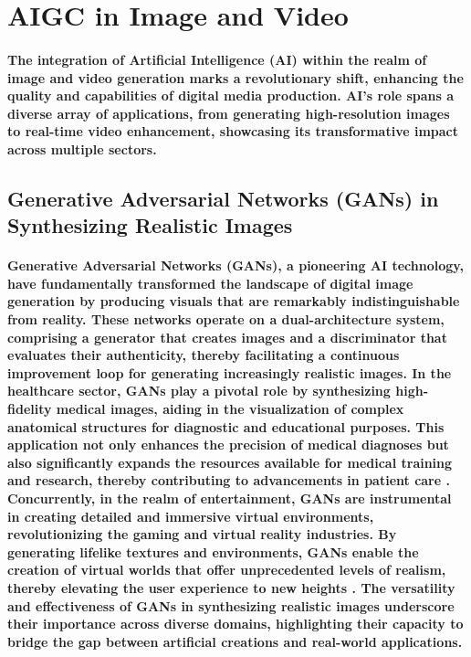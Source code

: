 \documentclass[11pt,a4paper,oneside]{report}
\begin{document}
\section{AIGC in Image and Video}
\paragraph{The integration of Artificial Intelligence (AI) within the realm of image and video generation marks a revolutionary shift, enhancing the quality and capabilities of digital media production. AI's role spans a diverse array of applications, from generating high-resolution images to real-time video enhancement, showcasing its transformative impact across multiple sectors.
}
\subsection{Generative Adversarial Networks (GANs) in Synthesizing Realistic Images}
\paragraph{Generative Adversarial Networks (GANs), a pioneering AI technology, have fundamentally transformed the landscape of digital image generation by producing visuals that are remarkably indistinguishable from reality. These networks operate on a dual-architecture system, comprising a generator that creates images and a discriminator that evaluates their authenticity, thereby facilitating a continuous improvement loop for generating increasingly realistic images. In the healthcare sector, GANs play a pivotal role by synthesizing high-fidelity medical images, aiding in the visualization of complex anatomical structures for diagnostic and educational purposes. This application not only enhances the precision of medical diagnoses but also significantly expands the resources available for medical training and research, thereby contributing to advancements in patient care \cite{granot2022drop}. Concurrently, in the realm of entertainment, GANs are instrumental in creating detailed and immersive virtual environments, revolutionizing the gaming and virtual reality industries. By generating lifelike textures and environments, GANs enable the creation of virtual worlds that offer unprecedented levels of realism, thereby elevating the user experience to new heights \cite{richter2022enhancing}. The versatility and effectiveness of GANs in synthesizing realistic images underscore their importance across diverse domains, highlighting their capacity to bridge the gap between artificial creations and real-world applications.
}
\end{document}
